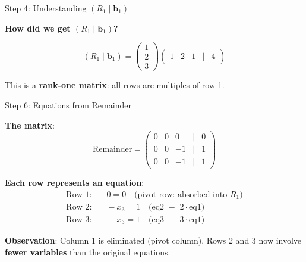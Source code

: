 \documentclass[10pt]{beamer}
\theoremstyle{definition}
\newcommand{\x}[1]{\alert{\textbf{#1}}}
\begin{document}
\begin{frame}{Step 4: Understanding $(R_1 \mid \mathbf{b}_1)$}

\x{How did we get $(R_1 \mid \mathbf{b}_1)$?}

$$(R_1 \mid \mathbf{b}_1) = \begin{pmatrix} 1 \\ 2 \\ 3 \end{pmatrix} \begin{pmatrix} 1 & 2 & 1 & | & 4 \end{pmatrix}$$

\vspace{1em}

This is a \x{rank-one matrix}: all rows are multiples of row 1.

\end{frame}

\begin{frame}{Step 6: Equations from Remainder}

\x{The matrix}:
$$\text{Remainder} = \begin{pmatrix}
0 & 0 & 0 & | & 0 \\
0 & 0 & -1 & | & 1 \\
0 & 0 & -1 & | & 1
\end{pmatrix}$$

\vspace{0.5em}

\x{Each row represents an equation}:
\begin{align*}
\text{Row 1}: &\quad 0 = 0 \quad \text{(pivot row: absorbed into $R_1$)} \\
\text{Row 2}: &\quad -x_3 = 1 \quad \text{(eq2 $-$ 2$\cdot$eq1)} \\
\text{Row 3}: &\quad -x_3 = 1 \quad \text{(eq3 $-$ 3$\cdot$eq1)}
\end{align*}

\x{Observation}: Column 1 is eliminated (pivot column).
Rows 2 and 3 now involve \x{fewer variables} than the original equations.

\end{frame}
\end{document}
